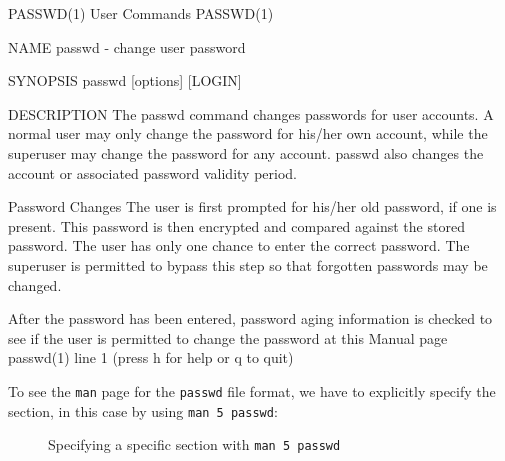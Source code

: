 \documentclass[10pt,american,]{book}
\newenvironment{Shaded}{\begin{snugshade}}{\end{snugshade}}
\newcommand{\KeywordTok}[1]{\textcolor[rgb]{0.13,0.29,0.53}{\textbf{{#1}}}}
\newcommand{\NormalTok}[1]{{#1}}
\numberwithin{figure}{chapter}
\DeclareRobustCommand{\drcap}[1]{\begin{figure}[H]\caption{#1}\end{figure}}
\renewcommand{\KeywordTok}[1]{{#1}}
\renewcommand{\NormalTok}[1]{{#1}}
\begin{document}
\begin{Shaded}
\begin{Highlighting}[]
\KeywordTok{PASSWD}\NormalTok{(1)                        }\KeywordTok{User} \NormalTok{Commands                       PASSWD(1)}

\KeywordTok{NAME}
       \KeywordTok{passwd} \NormalTok{- change user password}

\KeywordTok{SYNOPSIS}
       \KeywordTok{passwd} \NormalTok{[options] [LOGIN]}

\KeywordTok{DESCRIPTION}
       \KeywordTok{The} \NormalTok{passwd command changes passwords for user accounts. A normal user}
       \KeywordTok{may} \NormalTok{only change the password for his/her own account, while the}
       \KeywordTok{superuser} \NormalTok{may change the password for any account.  passwd also changes}
       \KeywordTok{the} \NormalTok{account or associated password validity period.}

   \KeywordTok{Password} \NormalTok{Changes}
       \KeywordTok{The} \NormalTok{user is first prompted for his/her old password, if one is present.}
       \KeywordTok{This} \NormalTok{password is then encrypted and compared against the stored}
       \KeywordTok{password.} \NormalTok{The user has only one chance to enter the correct password.}
       \KeywordTok{The} \NormalTok{superuser is permitted to bypass this step so that forgotten}
       \KeywordTok{passwords} \NormalTok{may be changed.}

       \KeywordTok{After} \NormalTok{the password has been entered, password aging information is}
       \KeywordTok{checked} \NormalTok{to see if the user is permitted to change the password at this}
 \KeywordTok{Manual} \NormalTok{page passwd(1) }\KeywordTok{line} \NormalTok{1 (press h for help or q to quit)}
\end{Highlighting}
\end{Shaded}

To see the \texttt{man} page for the \texttt{passwd} file format, we
have to explicitly specify the section, in this case by using
\texttt{man\ 5\ passwd}:

\drcap{Specifying a specific section with \texttt{man 5 passwd}}
\end{document}

